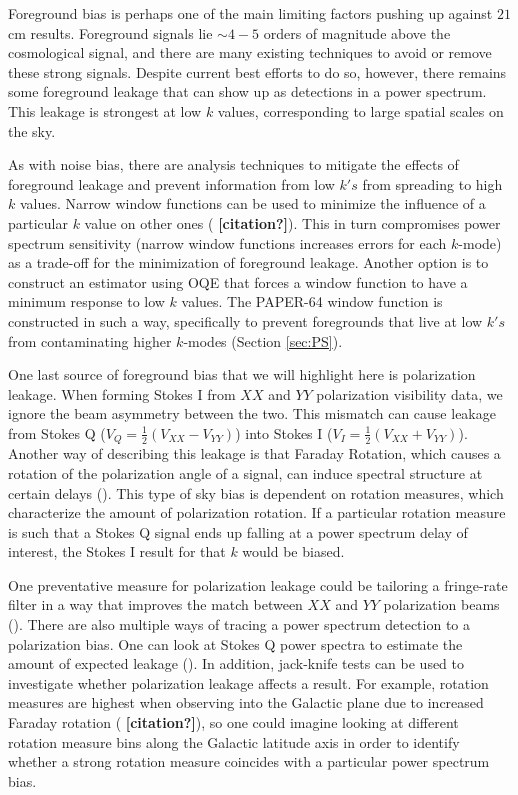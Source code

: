 \documentclass[preprint2,numberedappendix,tighten,twocolappendix]{aastex6}  %
\newcommand{\cc}[1]{{\color{purple} \textbf{[#1]}}}
\begin{document}
Foreground bias is perhaps one of the main limiting factors pushing up against $21$ cm results. Foreground signals lie $\sim4-5$ orders of magnitude above the cosmological signal, and there are many existing techniques to avoid or remove these strong signals. Despite current best efforts to do so, however, there remains some foreground leakage that can show up as detections in a power spectrum. This leakage is strongest at low $k$ values, corresponding to large spatial scales on the sky. 

As with noise bias, there are analysis techniques to mitigate the effects of foreground leakage and prevent information from low $k's$ from spreading to high $k$ values. Narrow window functions can be used to minimize the influence of a particular $k$ value on other ones (\cc{citation?}). This in turn compromises power spectrum sensitivity (narrow window functions increases errors for each $k$-mode) as a trade-off for the minimization of foreground leakage. Another option is to construct an estimator using OQE that forces a window function to have a minimum response to low $k$ values. The PAPER-64 window function is constructed in such a way, specifically to prevent foregrounds that live at low $k's$ from contaminating higher $k$-modes (Section \ref{sec:PS}).

One last source of foreground bias that we will highlight here is polarization leakage. When forming Stokes I from $XX$ and $YY$ polarization visibility data, we ignore the beam asymmetry between the two. This mismatch can cause leakage from Stokes Q ($V_{Q} = \frac{1}{2}(V_{XX}-V_{YY})$) into Stokes I ($V_{I} = \frac{1}{2}(V_{XX}+V_{YY})$). Another way of describing this leakage is that Faraday Rotation, which causes a rotation of the polarization angle of a signal, can induce spectral structure at certain delays (\citealt{moore_et_al2013}). This type of sky bias is dependent on rotation measures, which characterize the amount of polarization rotation. If a particular rotation measure is such that a Stokes Q signal ends up falling at a power spectrum delay of interest, the Stokes I result for that $k$ would be biased. 

One preventative measure for polarization leakage could be tailoring a fringe-rate filter in a way that improves the match between $XX$ and $YY$ polarization beams (\citealt{parsons_et_al2016}). There are also multiple ways of tracing a power spectrum detection to a polarization bias. One can look at Stokes Q power spectra to estimate the amount of expected leakage (\citealt{moore_et_al2013}). In addition, jack-knife tests can be used to investigate whether polarization leakage affects a result. For example, rotation measures are highest when observing into the Galactic plane due to increased Faraday rotation (\cc{citation?}), so one could imagine looking at different rotation measure bins along the Galactic latitude axis in order to identify whether a strong rotation measure coincides with a particular power spectrum bias. 
\end{document}
